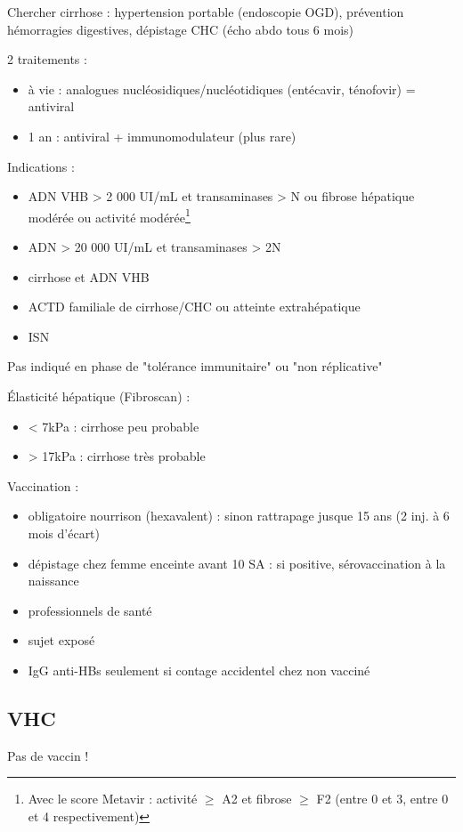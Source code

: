 \documentclass[11pt]{article}
\begin{document}
Chercher cirrhose : hypertension portable (endoscopie \gls{OGD}), prévention
hémorragies digestives, dépistage CHC (écho abdo tous 6 mois)

2 traitements :
\begin{itemize}
\item à vie : analogues nucléosidiques/nucléotidiques (entécavir, ténofovir) =
antiviral
\item 1 an : antiviral + immunomodulateur (plus rare)
\end{itemize}

Indications :
\begin{itemize}
\item ADN VHB > 2 000 UI/mL et transaminases > N ou fibrose hépatique modérée ou
activité modérée\footnote{Avec le score Metavir : activité \(\ge\) A2 et fibrose \(\ge\) F2 (entre 0 et 3,
entre 0 et 4 respectivement)}
\item ADN > 20 000 UI/mL et transaminases > 2N
\item cirrhose et ADN VHB
\item ACTD familiale de cirrhose/CHC ou atteinte extrahépatique
\item ISN
\end{itemize}
Pas indiqué en phase de "tolérance immunitaire" ou "non réplicative"

Élasticité hépatique (Fibroscan) :
\begin{itemize}
\item < 7kPa : cirrhose peu probable
\item > 17kPa : cirrhose très probable
\end{itemize}

Vaccination :
\begin{itemize}
\item obligatoire nourrison (hexavalent) : sinon rattrapage jusque 15 ans (2 inj. à
6 mois d'écart)
\item dépistage chez femme enceinte avant 10 SA : si positive, sérovaccination à la
naissance
\item professionnels de santé
\item sujet exposé
\item IgG anti-HBs seulement si contage accidentel chez non vacciné
\end{itemize}

\subsection{VHC}
\label{sec:orga8b89ef}
Pas de vaccin !
\end{document}
